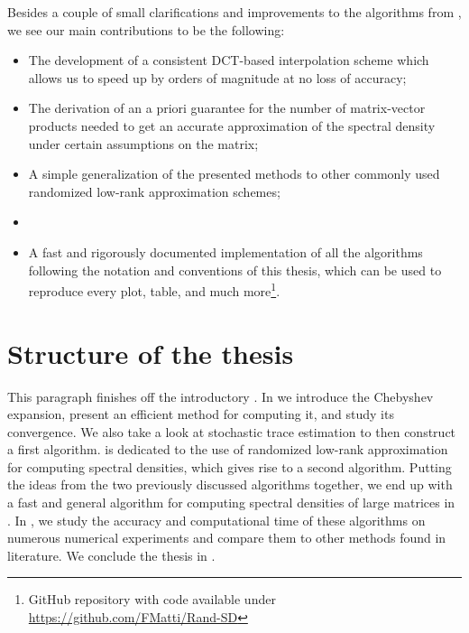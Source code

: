 Besides a couple of small clarifications and improvements to the algorithms 
from \cite{lin2017randomized}, we see our main contributions to be the following:%

\begin{itemize}
    \item The development of a consistent \gls{DCT}-based interpolation scheme which allows us
          to speed up \cite[Algorithm~5]{lin2017randomized} by orders of magnitude
          at no loss of accuracy;
    \item The derivation of an a priori guarantee for the number of matrix-vector
          products needed to get an accurate approximation of the spectral
          density under certain assumptions on the matrix;
    \item A simple generalization of the presented methods to other
          commonly used randomized low-rank approximation schemes;
    \item {}
    \item A fast and rigorously documented implementation of all the algorithms
          following the notation and conventions of this thesis, which can be used to
          reproduce every plot, table, and much more\footnote{GitHub repository with
          code available under \url{https://github.com/FMatti/Rand-SD}}.
\end{itemize}


\section{Structure of the thesis}
\label{sec:1-introduction-structure}

This paragraph finishes off the introductory .
In  we introduce the Chebyshev expansion, present an
efficient method for computing it, and study its convergence. We also take a
look at stochastic trace estimation to then construct a first algorithm.
 is dedicated to the use of randomized low-rank approximation
for computing spectral densities, which gives rise to a second algorithm.
Putting the ideas from the two previously discussed algorithms together,
we end up with a fast and general algorithm for computing spectral densities
of large matrices in . In ,
we study the accuracy and computational time of these algorithms on numerous
numerical experiments and compare them to other methods found in literature.
We conclude the thesis in .
